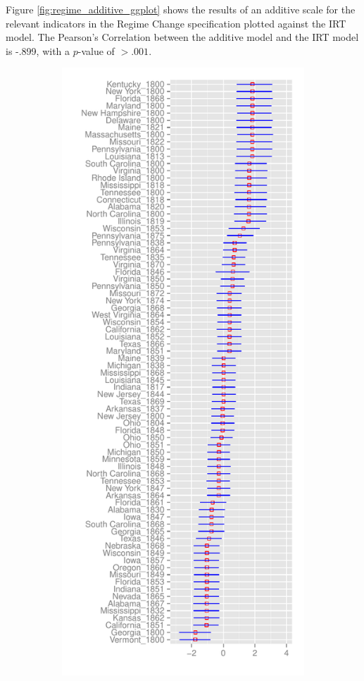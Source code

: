 \documentclass[JohnsonMADraft3]{subfiles}
\begin{document}
Figure \ref{fig:regime_additive_ggplot} shows the results of an additive scale for the relevant indicators in the Regime Change specification plotted against the IRT model.  The Pearson's Correlation between the additive model and the IRT model is -.899, with a $p$-value of $>.001$.

\begin{figure}
	\centering	\caption{Regime Change Specification- Parameter Means}\label{regime_parametermean}
	\begin{subfigure}{.5\textwidth}
		\centering
		\includegraphics[height=\textheight]{graphics/regime/regime_param_mean_first_ggplot.pdf}

\end{subfigure}
\end{figure}
\end{document}

